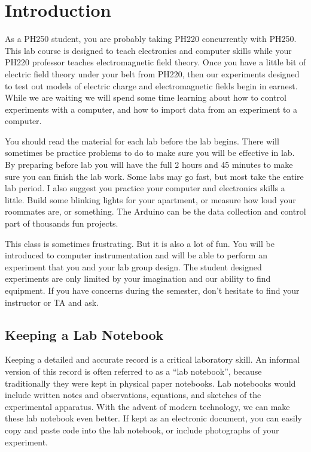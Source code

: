 \chapter*{Introduction}

As a PH250 student, you are probably taking PH220 concurrently with PH250. This lab course is designed to teach electronics and computer skills while your PH220 professor teaches electromagnetic field theory. Once you have a little bit of electric field theory under your belt from PH220, then our experiments designed to test out models of electric charge and electromagnetic fields begin in earnest. While we are waiting we will spend some time learning about how to control experiments with a computer, and how to import data from an experiment to a computer.

You should read the material for each lab before the lab begins. There will sometimes be practice problems to do to make sure you will be effective in lab. By preparing before lab you will have the full 2 hours and 45 minutes to make sure you can finish the lab work. Some labs may go fast, but most take the entire lab period. I also suggest you practice your computer and electronics skills a little. Build some blinking lights for your apartment, or measure how loud your roommates are, or something. The Arduino can be the data collection and control part of thousands fun projects.

This class is sometimes frustrating. But it is also a lot of fun. You will be introduced to computer instrumentation and will be able to perform an experiment that you and your lab group design. The student designed experiments are only limited by your imagination and our ability to find equipment. If you have concerns during the semester, don't hesitate to find your instructor or TA and ask.

\section*{Keeping a Lab Notebook}

Keeping a detailed and accurate record is a critical laboratory skill. An 
informal version of this record is often referred to as a ``lab notebook'',
because traditionally they were kept in physical paper notebooks. Lab
notebooks would include written notes and observations, equations, and sketches
of the experimental apparatus. With the advent of modern technology, we can
make these lab notebook even better. If kept as an electronic document, you
can easily copy and paste code into the lab notebook, or include photographs
of your experiment.

